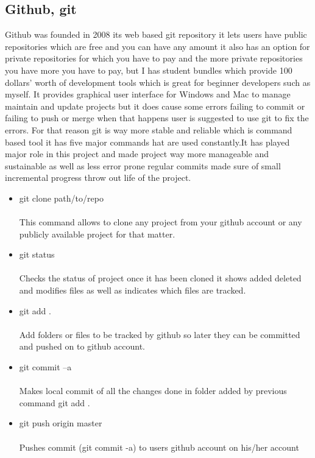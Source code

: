 \subsection{Github, git}
\bigbreak
Github was founded in 2008 its web based git repository it lets users have public repositories which are free and you can have any amount it also has an option for private repositories for which you have to pay and the more private repositories you have more you have to pay, but I has student bundles which provide 100 dollars’ worth of development tools which is great for beginner developers such as myself. It provides graphical user interface for Windows and Mac to manage maintain and update projects but it does cause some errors failing to commit or failing to push or merge when that happens user is suggested to use git to fix the errors. For that reason git is way more stable and reliable which is command based tool it has five major commands hat are used constantly.It has played major role in this project and made project way more manageable and sustainable as well as less error prone regular commits made sure of small incremental progress throw out life of the project.

\begin{itemize}
	
\item git clone path/to/repo \\
\\This command allows to clone any project from your github account or any publicly available project for that matter.

\item git status \\
\\Checks the status of project once it has been cloned it shows added deleted and modifies files as well as indicates which files are tracked.

\item git add . \\ 
\\Add folders or files to be tracked by github so later they can be committed and pushed on to github account.

\item git commit –a \\
\\Makes local commit of all the changes done in folder added by previous command git add .

\item git push origin master \\ 
\\ Pushes commit (git commit -a) to users github account on his/her account

\end{itemize}


